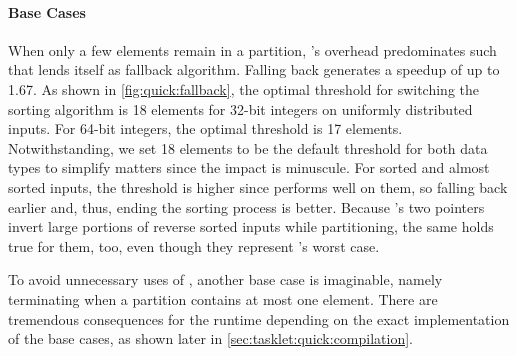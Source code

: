 \paragraph{Base Cases}
When only a few elements remain in a partition, \QS{}'s overhead predominates such that \IS{} lends itself as fallback algorithm.
Falling back generates a speedup of up to \num{1.67}.
As shown in \cref{fig:quick:fallback}, the optimal threshold for switching the sorting algorithm is 18 elements for 32-bit integers on uniformly distributed inputs.
For 64-bit integers, the optimal threshold is 17 elements.
Notwithstanding, we set 18 elements to be the default threshold for both data types to simplify matters since the impact is minuscule.
For sorted and almost sorted inputs, the threshold is higher since \IS{} performs well on them, so falling back earlier and, thus, ending the sorting process is better.
Because \QS{}'s two pointers invert large portions of reverse sorted inputs while partitioning, the same holds true for them, too, even though they represent \IS{}'s worst case.

To avoid unnecessary uses of \IS{}, another base case is imaginable, namely terminating when a partition contains at most one element.
There are tremendous consequences for the runtime depending on the exact implementation of the base cases, as shown later in \cref{sec:tasklet:quick:compilation}.

